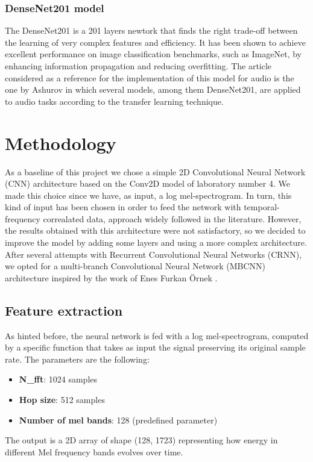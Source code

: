 \documentclass{article}
\begin{document}
\begin{sloppy}
\subsubsection{DenseNet201 model}
\label{sec:DenseNet201_model}
The DenseNet201 \cite{transfer_learning_esc2020} is a 201 layers newtork that finds the right trade-off between the learning of very
complex features and efficiency. It has been shown to achieve excellent performance on image classification
benchmarks, such as ImageNet, by enhancing information propagation and reducing overfitting. The article considered
as a reference for the implementation of this model for audio is the one by Ashurov \cite{electronics11152279}
in which several models, among them DenseNet201, are applied to audio tasks according to the transfer learning technique.


\section{Methodology}
\label{sec:methodology}
As a baseline of this project we chose a simple 2D Convolutional Neural Network (CNN) architecture based on the Conv2D model of laboratory number 4.
We made this choice since we have, as input, a log mel-spectrogram. In turn, this kind of input has been chosen in order to feed the network with
temporal-frequency correalated data, approach widely followed in the literature. However, the results obtained with this architecture were not satisfactory,
so we decided to improve the model by adding some layers and using a more complex architecture. After several attempts with Recurrent Convolutional Neural Networks (CRNN),
we opted for a multi-branch Convolutional Neural Network (MBCNN) architecture inspired by the work of Enes Furkan Örnek \cite{audio_classification_esc50, latifi2025classificationheartsoundsusing}.

\subsection{Feature extraction}
\label{sec:feature_extraction}
As hinted before, the neural network is fed with a log mel-spectrogram, computed by a specific function that takes as input
the signal preserving its original sample rate. The parameters are the following:
\begin{itemize}
    \item \textbf{N\_fft}: 1024 samples
    \item \textbf{Hop size}: 512 samples
    \item \textbf{Number of mel bands}: 128 (predefined parameter)
\end{itemize}
The output is a 2D array of shape (128, 1723) representing how energy in different Mel frequency bands evolves over time.


\end{sloppy}
\end{document}
